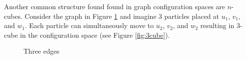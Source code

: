 Another common structure found found in graph configuration spaces are \(n\)-cubes.
Consider the graph in Figure \ref{fig:3edges} and imagine \(3\) particles placed at \(u_1\), \(v_1\), and \(w_1\).
Each particle can simultaneously move to \(u_2\), \(v_2\), and \(w_2\) resulting in \(3\)-cube in the configuration space (see Figure \ref{fig:3cube}).

\begin{figure}[h!]
    \centering
{}
    \caption{Three edges}
    \label{fig:3edges}
\end{figure}


